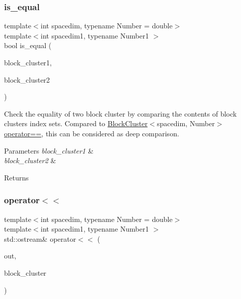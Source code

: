 \subsubsection{\texorpdfstring{is\+\_\+equal}{is\_equal}}
{\footnotesize\ttfamily template$<$int spacedim, typename Number = double$>$ \\
template$<$int spacedim1, typename Number1 $>$ \\
bool is\+\_\+equal (\begin{DoxyParamCaption}\item[{const \hyperlink{classBlockCluster}{Block\+Cluster}$<$ spacedim, Number $>$ \&}]{block\+\_\+cluster1,  }\item[{const \hyperlink{classBlockCluster}{Block\+Cluster}$<$ spacedim, Number $>$ \&}]{block\+\_\+cluster2 }\end{DoxyParamCaption})\hspace{0.3cm}{\ttfamily [friend]}}

Check the equality of two block cluster by comparing the contents of block cluster\textquotesingle{}s index sets. Compared to {\ttfamily \hyperlink{classBlockCluster}{Block\+Cluster}$<$spacedim}, Number$>$\hyperlink{block__cluster_8h_ac23e3e876ac4316263d9ce0c4f51ad07}{operator==}, this can be considered as deep comparison.


\begin{DoxyParams}{Parameters}
{\em block\+\_\+cluster1} & \\
\hline
{\em block\+\_\+cluster2} & \\
\hline
\end{DoxyParams}
\begin{DoxyReturn}{Returns}

\end{DoxyReturn}
\mbox{\label{classBlockCluster_a9721dfd2e13c7fc896f6f1e9e1c1ed04}} 
\subsubsection{\texorpdfstring{operator$<$$<$}{operator<<}}
{\footnotesize\ttfamily template$<$int spacedim, typename Number = double$>$ \\
template$<$int spacedim1, typename Number1 $>$ \\
std\+::ostream\& operator$<$$<$ (\begin{DoxyParamCaption}\item[{std\+::ostream \&}]{out,  }\item[{const \hyperlink{classBlockCluster}{Block\+Cluster}$<$ spacedim1, Number1 $>$ \&}]{block\+\_\+cluster }\end{DoxyParamCaption})\hspace{0.3cm}{\ttfamily [friend]}}

